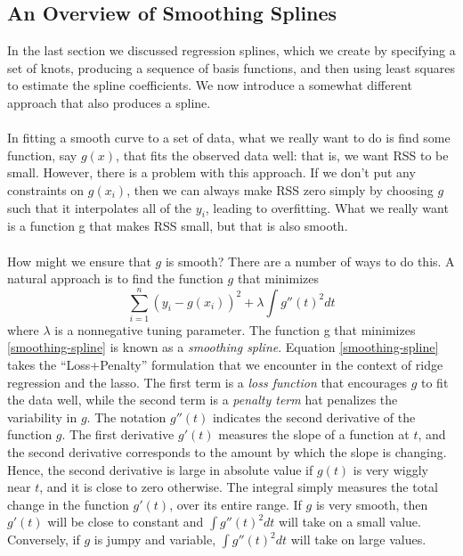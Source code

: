 \subsection{ An Overview of Smoothing Splines}
In the last section we discussed regression splines, which we create by specifying a set of knots, producing a sequence of basis functions, and then using least squares to estimate the spline coefficients. We now introduce a somewhat different approach that also produces a spline.\\\\
In fitting a smooth curve to a set of data, what we really want to do is find some function, say $g(x)$, that fits the observed data well: that is, we want RSS to be small. However, there is a problem with this approach. If we don’t put any constraints on $g(x_i)$, then we can always make RSS zero simply by choosing $g$ such that it interpolates all of the $y_i$, leading to overfitting. What we really want is a function g that makes RSS small, but that is also smooth.\\\\
How might we ensure that $g$ is smooth? There are a number of ways to do this. A natural approach is to find the function $g$ that minimizes
\begin{equation}
    \sum_{i=1}^n (y_i - g(x_i))^2 + \lambda \int g''(t)^2 dt
    \label{smoothing-spline}
\end{equation}
where $\lambda$ is a nonnegative tuning parameter. The function g that minimizes \ref{smoothing-spline} is known as a \textit{smoothing spline}. Equation \ref{smoothing-spline}  takes the “Loss+Penalty” formulation that we encounter in the context of ridge regression and the lasso. The first term is a \textit{loss function} that encourages $g$ to fit the data well, while the second term is a \textit{penalty term} hat penalizes the variability in $g$. The notation $g''(t)$ indicates the second derivative of the function $g$. The first derivative $g'(t)$
measures the slope of a function at $t$, and the second derivative corresponds to the amount by which the slope is changing. Hence, the second derivative is large in absolute value if $g(t)$ is very wiggly near $t$, and it is close to zero otherwise. The integral simply measures the total change in the function $g'(t)$, over its entire range. If $g$ is very smooth, then $g'(t)$ will be close to constant and $\int g''(t)^2 dt$ will take on a small value. Conversely, if $g$ is jumpy and variable, $\int g''(t)^2 dt$ will take on large values.\\\\
